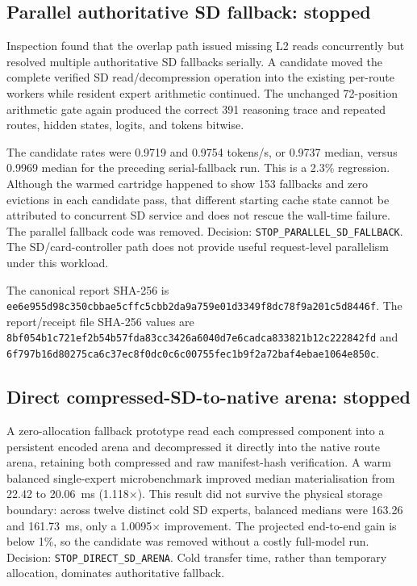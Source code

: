 \subsection{Parallel authoritative SD fallback: stopped}

Inspection found that the overlap path issued missing L2 reads concurrently but
resolved multiple authoritative SD fallbacks serially.  A candidate moved the
complete verified SD read/decompression operation into the existing per-route
workers while resident expert arithmetic continued.  The unchanged 72-position
arithmetic gate again produced the correct 391 reasoning trace and repeated
routes, hidden states, logits, and tokens bitwise.

The candidate rates were 0.9719 and 0.9754 tokens/s, or 0.9737 median, versus
0.9969 median for the preceding serial-fallback run.  This is a 2.3\%
regression.  Although the warmed cartridge happened to show 153 fallbacks and
zero evictions in each candidate pass, that different starting cache state
cannot be attributed to concurrent SD service and does not rescue the wall-time
failure.  The parallel fallback code was removed.  Decision:
\texttt{STOP\_PARALLEL\_SD\_FALLBACK}.  The SD/card-controller path does not
provide useful request-level parallelism under this workload.

The canonical report SHA-256 is
\texttt{ee6e955d98c350cbbae5cffc5cbb2da9a759e01d3349f8dc78f9a201c5d8446f}.
The report/receipt file SHA-256 values are
\texttt{8bf054b1c721ef2b54b57fda83cc3426a6040d7e6cadca833821b12c222842fd}
and
\texttt{6f797b16d80275ca6c37ec8f0dc0c6c00755fec1b9f2a72baf4ebae1064e850c}.

\subsection{Direct compressed-SD-to-native arena: stopped}

A zero-allocation fallback prototype read each compressed component into a
persistent encoded arena and decompressed it directly into the native route
arena, retaining both compressed and raw manifest-hash verification.  A warm
balanced single-expert microbenchmark improved median materialisation from
22.42 to 20.06~ms (1.118$\times$).  This result did not survive the physical
storage boundary: across twelve distinct cold SD experts, balanced medians were
163.26 and 161.73~ms, only a 1.0095$\times$ improvement.  The projected
end-to-end gain is below 1\%, so the candidate was removed without a costly
full-model run.  Decision: \texttt{STOP\_DIRECT\_SD\_ARENA}.  Cold transfer
time, rather than temporary allocation, dominates authoritative fallback.

